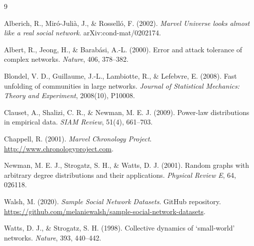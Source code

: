 \documentclass[11pt]{article}
\begin{document}
\newpage
\begin{thebibliography}{9}

Alberich, R., Miró-Julià, J., \& Rosselló, F. (2002).
\textit{Marvel Universe looks almost like a real social network}.
arXiv:cond-mat/0202174.

Albert, R., Jeong, H., \& Barabási, A.-L. (2000).
Error and attack tolerance of complex networks.
\textit{Nature}, 406, 378--382.

Blondel, V. D., Guillaume, J.-L., Lambiotte, R., \& Lefebvre, E. (2008).
Fast unfolding of communities in large networks.
\textit{Journal of Statistical Mechanics: Theory and Experiment}, 2008(10), P10008.

Clauset, A., Shalizi, C. R., \& Newman, M. E. J. (2009).
Power-law distributions in empirical data.
\textit{SIAM Review}, 51(4), 661--703.

Chappell, R. (2001).
\textit{Marvel Chronology Project}.
\url{http://www.chronologyproject.com}.

Newman, M. E. J., Strogatz, S. H., \& Watts, D. J. (2001).
Random graphs with arbitrary degree distributions and their applications.
\textit{Physical Review E}, 64, 026118.

Walsh, M. (2020).
\textit{Sample Social Network Datasets}.
GitHub repository. \url{https://github.com/melaniewalsh/sample-social-network-datasets}.

Watts, D. J., \& Strogatz, S. H. (1998).
Collective dynamics of `small-world' networks.
\textit{Nature}, 393, 440--442.

\end{thebibliography}
\end{document}
